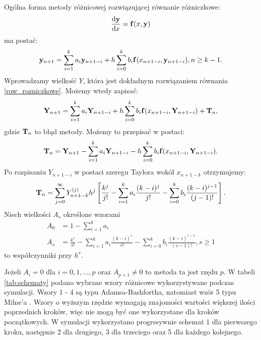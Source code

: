 \documentclass[10pt, a4paper, twoside, onecolumn]{article}
\numberwithin{equation}{section}
\begin{document}
	Ogólna forma metody różnicowej rozwiązującej równanie różniczkowe:
	\begin{equation}\label{row_rozniczkowe}
		\dv{\vb{y}}{x}=\vb{f}(x, \vb{y})
	\end{equation}
	ma postać:
	\begin{equation}\label{metoda_roznicowa}
		\vb{y}_{n+1} = \sum_{i=1}^{k}a_{i}\vb{y}_{n+1-i} + h\sum_{i=0}^{k}b_{i}\vb{f}(x_{n+1-i}, \vb{y}_{n+1-i}), n\geq k-1.
	\end{equation}
	Wprowadzamy wielkość \(Y\), która jest dokładnym rozwiązaniem równania \eqref{row_rozniczkowe}. Możemy wtedy zapisać: 
	\begin{equation}
		\vb{Y}_{n+1} = \sum_{i=1}^{k}a_{i}\vb{Y}_{n+1-i} + h\sum_{i=0}^{k}b_{i}\vb{f}(x_{n+1-i}, \vb{Y}_{n+1-i}) + \vb{T}_{n},
	\end{equation}
	gdzie \(\vb{T}_{n}\) to błąd metody. Możemy to przepisać w postaci:
	\begin{equation}
		\vb{T}_{n} = \vb{Y}_{n+1} - \sum_{i=1}^{k}a_{i}\vb{Y}_{n+1-i} - h\sum_{i=0}^{k}b_{i}\vb{f}(x_{n+1-i}, \vb{Y}_{n+1-i}).
	\end{equation}
	Po rozpisaniu \(Y_{n+1-i}\) w postaci szeregu Taylora wokół \(x_{n+1-k}\) otrzymujemy:
	\begin{equation}
		\vb{T}_{n} = \sum_{j=0}^{\infty}Y_{n+1-k}^{(j)}h^{j}\left[\frac{k^{j}}{j!} - \sum_{i=1}^{k}a_{i}\frac{(k-i)^{j}}{j!} - \sum_{i=0}^{k}b_{i}\frac{(k-i)^{j-1}}{(j-1)!}\right].
	\end{equation}
	Niech wielkości \(A_{s}\) określone wzorami
	\begin{equation}
	\begin{split}
		A_{0} &= 1 - \sum_{i=1}^{k}a_{i} \\
		A_{s} &= \frac{k^{s}}{s!} - \sum_{i=1}^{k}a_{i}\frac{(k-i)^{s}}{s!} - \sum_{i=0}^{k}b_{i}\frac{(k-i)^{s-1}}{(s-1)!}, s\geq 1
	\end{split}
	\end{equation}
	to współczynniki przy \(h^{s}\). \par
	Jeżeli \(A_{i}=0\) dla \(i=0, 1, \ldots, p\) oraz \(A_{p+1}\neq 0\) to metoda ta jest rzędu \(p\).
	W tabeli \ref{tab:schematy} podano wybrane wzory różnicowe wykorzystywane podczas symulacji. Wzory 1 - 4 są typu Adamsa-Bashfortha, natomiast wzór 5 typu Milne'a \cite{fortuna}. Wzory o wyższym rzędzie wymagają znajomości wartości większej ilości poprzednich kroków, więc nie mogą być one wykorzystane dla kroków początkowych. W symulacji wykorzystano progresywnie schemat 1 dla pierwszego kroku, następnie 2 dla drugiego, 3 dla trzeciego oraz 5 dla każdego kolejnego. 
\end{document}
